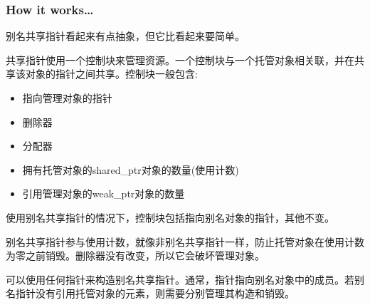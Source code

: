 \subsubsection{How it works…}

别名共享指针看起来有点抽象，但它比看起来要简单。

共享指针使用一个控制块来管理资源。一个控制块与一个托管对象相关联，并在共享该对象的指针之间共享。控制块一般包含:

\begin{itemize}
\item 
指向管理对象的指针

\item 
删除器

\item 
分配器

\item 
拥有托管对象的shared\_ptr对象的数量(使用计数)

\item 
引用管理对象的weak\_ptr对象的数量
\end{itemize}

使用别名共享指针的情况下，控制块包括指向别名对象的指针，其他不变。

别名共享指针参与使用计数，就像非别名共享指针一样，防止托管对象在使用计数为零之前销毁。删除器没有改变，所以它会破坏管理对象。

\begin{tcolorbox}[colback=webgreen!5!white,colframe=webgreen!75!black,title=重要的Note]
可以使用任何指针来构造别名共享指针。通常，指针指向别名对象中的成员。若别名指针没有引用托管对象的元素，则需要分别管理其构造和销毁。
\end{tcolorbox}




























